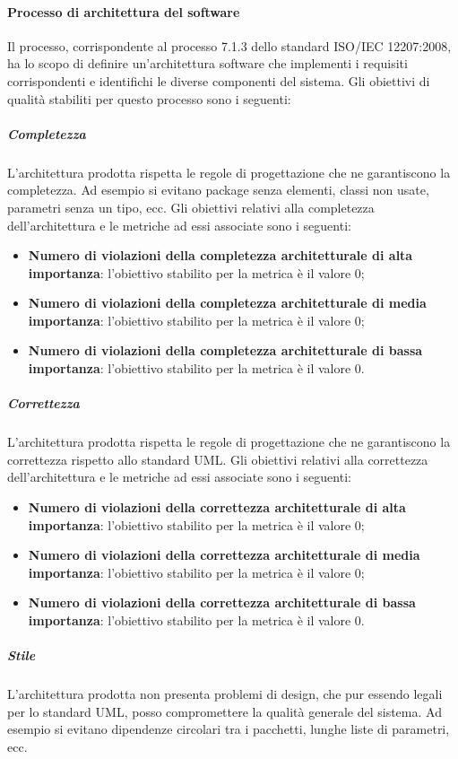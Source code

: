 			\paragraph{Processo di architettura del software}
			Il processo, corrispondente al processo 7.1.3 dello standard ISO/IEC 12207:2008, ha lo scopo di definire un'architettura software che implementi i requisiti corrispondenti e identifichi le diverse componenti del sistema.
			Gli obiettivi di qualità stabiliti per questo processo sono i seguenti:
				\subparagraph{Completezza}
				L'architettura prodotta rispetta le regole di progettazione che ne garantiscono la completezza. Ad esempio si evitano package senza elementi, classi non usate, parametri senza un tipo, ecc.
				Gli obiettivi relativi alla completezza dell'architettura e le metriche ad essi associate sono i seguenti:
		 		\begin{itemize}
					\item \textbf{Numero di violazioni della completezza architetturale di alta importanza}: l'obiettivo stabilito per la metrica è il valore 0;
					\item \textbf{Numero di violazioni della completezza architetturale di media importanza}: l'obiettivo stabilito per la metrica è il valore 0;
					\item \textbf{Numero di violazioni della completezza architetturale di bassa importanza}: l'obiettivo stabilito per la metrica è il valore 0.
				\end{itemize}
				\subparagraph{Correttezza}
				L'architettura prodotta rispetta le regole di progettazione che ne garantiscono la correttezza rispetto allo standard UML.
				Gli obiettivi relativi alla correttezza dell'architettura e le metriche ad essi associate sono i seguenti:
		 		\begin{itemize}
					\item \textbf{Numero di violazioni della correttezza architetturale di alta importanza}: l'obiettivo stabilito per la metrica è il valore 0;
					\item \textbf{Numero di violazioni della correttezza architetturale di media importanza}: l'obiettivo stabilito per la metrica è il valore 0;
					\item \textbf{Numero di violazioni della correttezza architetturale di bassa importanza}: l'obiettivo stabilito per la metrica è il valore 0.
				\end{itemize}
				\subparagraph{Stile}
				L'architettura prodotta non presenta problemi di design, che pur essendo legali per lo standard UML, posso compromettere la qualità generale del sistema. Ad esempio si evitano dipendenze circolari tra i pacchetti, lunghe liste di parametri, ecc.
